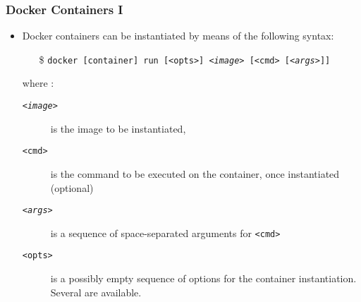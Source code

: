 \documentclass{beamer}\mode<presentation>{\usetheme{AMSBolognaFC}}
\begin{document}
\begin{frame}
\frametitle{Docker Containers I}

    \begin{itemize}
        \item Docker containers can be instantiated by means of the following syntax:
        \begin{itemize}
            \item[\$] \texttt{docker [container] \alert{run} [\alert{<opts>}] \alert{\textit{<image>}} [\alert{<cmd>} [\textit{\alert{<args>}}]]}
        \end{itemize}
        where :
        \begin{description}
            \item[\texttt{\textit{<image>}}] is the image to be instantiated,
            \item[\texttt{<cmd>}] is the command to be executed on the container, once instantiated (optional)
            \item[\texttt{\textit{<args>}}] is a sequence of space-separated arguments for \texttt{<cmd>}
            \item[\texttt{<opts>}] is a possibly empty sequence of options for the container instantiation. Several are available.
        \end{description}
    \end{itemize}
\end{frame}
\end{document}

